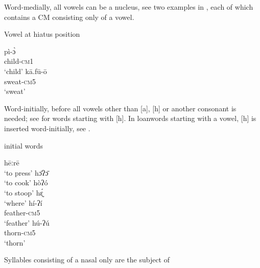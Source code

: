 \documentclass[output=paper]{langscibook}
\begin{document}
Word-medially, all vowels can be a nucleus, see two examples in , each of which contains a CM consisting only of a vowel.\largerpage[2]

 \begin{exe}\setlength\multicolsep{0pt}
     \ex \label{ex:traore:VowelHiatusPosition:6}Vowel at hiatus position
     \begin{multicols}{2}\raggedcolumns
     \begin{xlist}
         \ex \gll pì-ɔ̀ \\
            child-\textsc{cm1}\\
        \trans `child'
        \columnbreak\ex \gll kā.fū-ō \\
             sweat-\textsc{cm5}\\
             \trans `sweat'
     \end{xlist}
     \end{multicols}
 \end{exe}\pagebreak
        

Word-initially, before all vowels other than [a], [h] or another consonant is needed; see  for words starting with [h].  In loanwords starting with a vowel, [h] is inserted word-initially, see .

 \begin{exe}\setlength\multicolsep{0pt}
     \ex {[h]} initial words \label{ex:traore:hInitialWords:7}
     \begin{multicols}{2}\raggedcolumns
     \begin{xlist}
         \ex hēːrē\\
            `to press'
        \ex  hɔ̄ʔɔ̄  \\
            `to cook'
        \ex hòʔó \\
            `to stoop'
        \columnbreak
        \ex  hɛ̰́   \\
            `where'
        \ex \gll hí-ʔí\\
            feather-\textsc{cm5}\\
            \trans `feather'
        \ex  \gll hú-ʔú \\
            thorn-\textsc{cm5}\\
            \trans `thorn'
     \end{xlist}
     \end{multicols}
 \end{exe}

Syllables consisting of a nasal only are the subject of 
\end{document}

